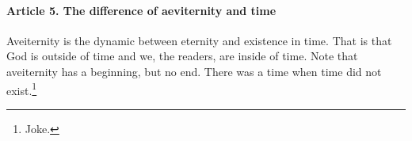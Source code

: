 \documentclass{ucetd}
\begin{document}
\paragraph{Article 5. The difference of aeviternity and time}
Aveiternity is the dynamic between eternity and existence in time. That is that God is outside of time and we, the readers, are inside of time. Note that aveiternity has a beginning, but no end. There was a time when time did not exist.\footnote{Joke.} 
\end{document}
